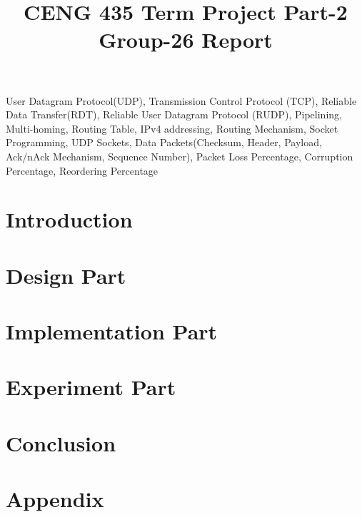 \documentclass[conference]{IEEEtran}
\begin{document}

\title{CENG 435 Term Project Part-2 Group-26 Report}


\author
{
\and
{}
}
\maketitle



\begin{abstract}
\label{abstract}


\end{abstract}

\begin {keywords}
User Datagram Protocol(UDP), Transmission Control Protocol (TCP), Reliable Data Transfer(RDT), Reliable User Datagram Protocol (RUDP), Pipelining, Multi-homing, Routing Table, IPv4 addressing, Routing Mechanism, Socket Programming, UDP Sockets, Data Packets(Checksum, Header, Payload, Ack/nAck Mechanism, Sequence Number), Packet Loss Percentage, Corruption Percentage, Reordering Percentage
\end{keywords}

\section{Introduction}
\label{intro}


\section{Design Part}
\label{section2}


\section{Implementation Part}
\label{section3}



\section{Experiment Part}
\label{section4}

	
\section{Conclusion}
\label {conclusion}


\section{Appendix}
\label {appendix}






\end{document}

